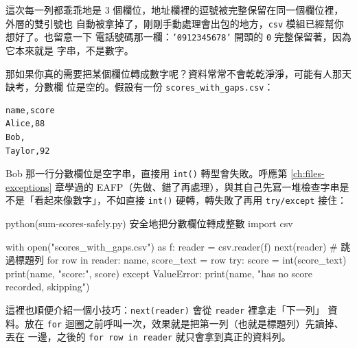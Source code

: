 
這次每一列都乖乖地是 3 個欄位，地址欄裡的逗號被完整保留在同一個欄位裡，外層的雙引號也
自動被拿掉了，剛剛手動處理會出包的地方，\texttt{csv} 模組已經幫你想好了。也留意一下
電話號碼那一欄：\texttt{'0912345678'} 開頭的 \texttt{0} 完整保留著，因為它本來就是
字串，不是數字。


那如果你真的需要把某個欄位轉成數字呢？資料常常不會乾乾淨淨，可能有人那天缺考，分數欄
位是空的。假設有一份 \texttt{scores\_with\_gaps.csv}：

\begin{verbatim}
name,score
Alice,88
Bob,
Taylor,92
\end{verbatim}

Bob 那一行分數欄位是空字串，直接用 \texttt{int()} 轉型會失敗。呼應第 \ref{ch:files-exceptions} 章學過的
EAFP（先做、錯了再處理），與其自己先寫一堆檢查字串是不是「看起來像數字」，不如直接
\texttt{int()} 硬轉，轉失敗了再用 \texttt{try/except} 接住：

\begin{example}{python}{(sum-scores-safely.py) 安全地把分數欄位轉成整數}
import csv

with open("scores_with_gaps.csv") as f:
    reader = csv.reader(f)
    next(reader)                              # 跳過標題列
    for row in reader:
        name, score_text = row
        try:
            score = int(score_text)
            print(name, "score:", score)
        except ValueError:
            print(name, "has no score recorded, skipping")
\end{example}


這裡也順便介紹一個小技巧：\texttt{next(reader)} 會從 \texttt{reader} 裡拿走「下一列」
資料。放在 \texttt{for} 迴圈之前呼叫一次，效果就是把第一列（也就是標題列）先讀掉、丟在
一邊，之後的 \texttt{for row in reader} 就只會拿到真正的資料列。

